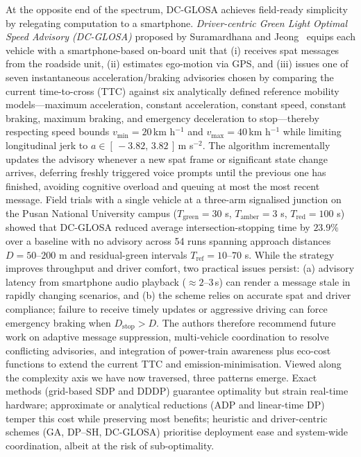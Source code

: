 At the opposite end of the spectrum, DC-GLOSA achieves field-ready simplicity by relegating computation to a smartphone. \textit{Driver-centric Green Light Optimal Speed Advisory (DC-GLOSA)} proposed by Suramardhana and Jeong~\cite{Suramardhana2014} equips each vehicle with a smartphone-based on-board unit that (i) receives \ac{spat} messages from the roadside unit, (ii) estimates ego-motion via GPS, and (iii) issues one of seven instantaneous acceleration/braking advisories chosen by comparing the current time-to-cross (TTC) against six analytically defined reference mobility models—maximum acceleration, constant acceleration, constant speed, constant braking, maximum braking, and emergency deceleration to stop—thereby respecting speed bounds $v_{\min}=20\,$km h$^{-1}$ and $v_{\max}=40\,$km h$^{-1}$ while limiting longitudinal jerk to $a\in[\,{-}3.82,\,3.82\,]\,$m s$^{-2}$. The algorithm incrementally updates the advisory whenever a new \ac{spat} frame or significant state change arrives, deferring freshly triggered voice prompts until the previous one has finished, avoiding cognitive overload and queuing at most the most recent message. Field trials with a single vehicle at a three-arm signalised junction on the Pusan National University campus ($T_{\text{green}}=30$ s, $T_{\text{amber}}=3$ s, $T_{\text{red}}=100$ s) showed that DC-GLOSA reduced average intersection-stopping time by $23.9\%$ over a baseline with no advisory across 54 runs spanning approach distances $D=50\text{–}200$ m and residual-green intervals $T_{\text{ref}}=10\text{–}70$ s. While the strategy improves throughput and driver comfort, two practical issues persist: (a) advisory latency from smartphone audio playback ($\approx 2$–$3$\,s) can render a message stale in rapidly changing scenarios, and (b) the scheme relies on accurate \ac{spat} and driver compliance; failure to receive timely updates or aggressive driving can force emergency braking when $D_{\text{stop}}>D$. The authors therefore recommend future work on adaptive message suppression, multi-vehicle coordination to resolve conflicting advisories, and integration of power-train awareness plus eco-cost functions to extend the current TTC and emission-minimisation.
\mynewline
Viewed along the complexity axis we have now traversed, three patterns emerge. Exact methods (grid-based SDP and DDDP) guarantee optimality but strain real-time hardware; approximate or analytical reductions (ADP and linear-time DP) temper this cost while preserving most benefits; heuristic and driver-centric schemes (GA, DP–SH, DC-GLOSA) prioritise deployment ease and system-wide coordination, albeit at the risk of sub-optimality.
